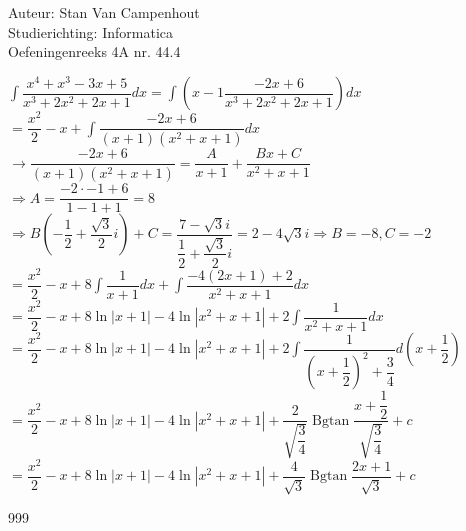 \documentclass[a4paper]{article}
\begin{document}
  
\noindent \large Auteur: Stan Van Campenhout \\
\noindent \large Studierichting:  Informatica\\
\noindent \large Oefeningenreeks 4A nr. 44.4\\

\medskip

\normalsize

$ \displaystyle\int\dfrac{x^4+x^3-3x+5}{x^3+2x^2+2x+1}dx = \displaystyle\int\left(x-1\dfrac{-2x+6}{x^3+2x^2+2x+1}\right)dx $\\

$ = \dfrac{x^2}{2}-x+\displaystyle\int\dfrac{-2x+6}{\left(x+1\right)\left(x^2+x+1\right)}dx $\\

$ \rightarrow \dfrac{-2x+6}{\left(x+1\right)\left(x^2+x+1\right)} = \dfrac{A}{x+1} + \dfrac{Bx+C}{x^2+x+1} $\\

$ \Rightarrow A = \dfrac{-2\cdot-1+6}{1-1+1} = 8 $\\

$ \Rightarrow B\left(-\dfrac{1}{2}+\dfrac{\sqrt{3}}{2}i\right) + C = \dfrac{7-\sqrt{3}i}{\dfrac{1}{2}+\dfrac{\sqrt{3}}{2}i} = 2 -4\sqrt{3}i \Rightarrow B = -8, C = -2 $\\

$ = \dfrac{x^2}{2}-x+8\displaystyle\int\dfrac{1}{x+1}dx + \displaystyle\int\dfrac{-4\left(2x+1\right)+2}{x^2+x+1}dx $\\

$ = \dfrac{x^2}{2}-x+8\ln|x+1|-4\ln|x^2+x+1|+2\displaystyle\int\dfrac{1}{x^2+x+1}dx $\\

$ = \dfrac{x^2}{2}-x+8\ln|x+1|-4\ln|x^2+x+1|+2\displaystyle\int\dfrac{1}{\left(x+\dfrac{1}{2}\right)^2+\dfrac{3}{4}}d\left(x+\dfrac{1}{2}\right) $\\

$ = \dfrac{x^2}{2}-x+8\ln|x+1|-4\ln|x^2+x+1| +\dfrac{2}{\sqrt{\dfrac{3}{4}}}\operatorname{Bgtan}\dfrac{x+\dfrac{1}{2}}{\sqrt{\dfrac{3}{4}}} + c $\\

$ = \dfrac{x^2}{2}-x+8\ln|x+1|-4\ln|x^2+x+1| +\dfrac{4}{\sqrt{3}}\operatorname{Bgtan}\dfrac{2x+1}{\sqrt{3}} + c $\\

\begin{thebibliography}{999}
\end{thebibliography}
\end{document}
